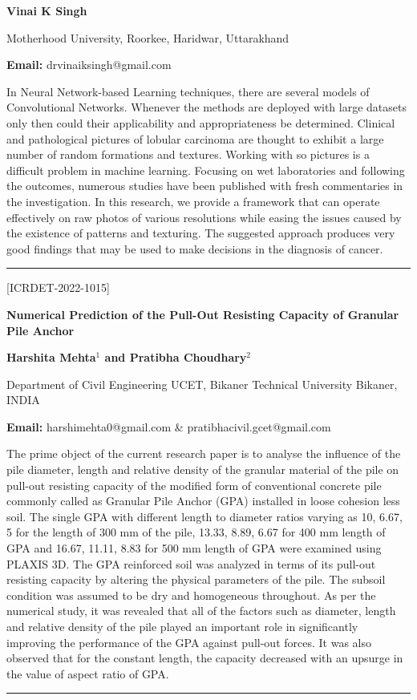 \documentclass[twoside,11pt]{amsart}
\begin{document}
\centerline{\textbf{Vinai K Singh}}
\vskip 5mm
\begin{flushleft}
Motherhood University, Roorkee, Haridwar, Uttarakhand
\vskip 5mm
\end{flushleft}
\vskip 2mm
\begin{flushleft}
{\bf Email:} drvinaiksingh@gmail.com
\end{flushleft}
\vskip 10mm
In Neural Network-based Learning techniques, there are several models of Convolutional
Networks. Whenever the methods are deployed with large datasets only then could their applicability
and appropriateness be determined. Clinical and pathological pictures of lobular carcinoma are thought
to exhibit a large number of random formations and textures. Working with so pictures is a difficult
problem in machine learning. Focusing on wet laboratories and following the outcomes, numerous studies
have been published with fresh commentaries in the investigation. In this research, we provide a
framework that can operate effectively on raw photos of various resolutions while easing the issues
caused by the existence of patterns and texturing. The suggested approach produces very good findings
that may be used to make decisions in the diagnosis of cancer.
\vskip 2mm
\rule{\textwidth}{0.5pt}
\vskip 2mm
\begin{flushleft}
\centerline{[ICRDET-2022-1015]}
\end{flushleft}
\begin{center}\bf\LARGE
Numerical Prediction of the Pull-Out Resisting
Capacity of Granular Pile Anchor
\end{center}
\vskip 2mm
\centerline{\textbf{Harshita Mehta$^{1}$ and Pratibha Choudhary$^{2}$  }}
\newpage
\vskip 5mm
\begin{flushleft}
Department of Civil Engineering
UCET, Bikaner Technical University
Bikaner, INDIA
\vskip 5mm
\end{flushleft}
\vskip 2mm
\begin{flushleft}
{\bf Email:} harshimehta0@gmail.com \& pratibhacivil.gcet@gmail.com
\end{flushleft}
\vskip 10mm
The prime object of the current research paper is to analyse the influence of the pile diameter, length and relative density of
the granular material of the pile on pull-out resisting capacity of the modified form of conventional concrete pile commonly called as
Granular Pile Anchor (GPA) installed in loose cohesion less soil. The single GPA with different length to diameter ratios varying as 10,
6.67, 5 for the length of 300 mm of the pile, 13.33, 8.89, 6.67 for 400 mm length of GPA and 16.67, 11.11, 8.83 for 500 mm length of GPA
were examined using PLAXIS 3D. The GPA reinforced soil was analyzed in terms of its pull-out resisting capacity by altering the
physical parameters of the pile. The subsoil condition was assumed to be dry and homogeneous throughout. As per the numerical study,
it was revealed that all of the factors such as diameter, length and relative density of the pile played an important role in significantly
improving the performance of the GPA against pull-out forces. It was also observed that for the constant length, the capacity decreased
with an upsurge in the value of aspect ratio of GPA.
\vskip 2mm
\rule{\textwidth}{0.5pt}
\end{document}
